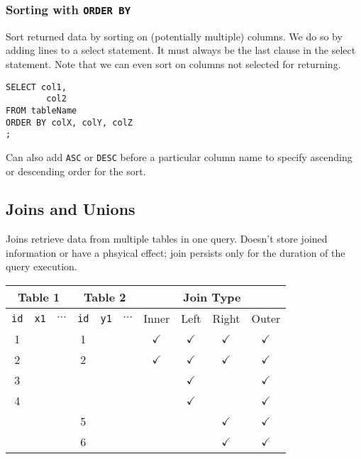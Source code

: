 \documentclass[12pt]{article}
\theoremstyle{plain}
\theoremstyle{definition}
\theoremstyle{remark}
\begin{document}
\subsubsection{Sorting with \texttt{ORDER BY}}

Sort returned data by sorting on (potentially multiple) columns.
We do so by adding lines to a select statement.
It must always be the last clause in the select statement.
Note that we can even sort on columns not selected for returning.
\begin{lstlisting}
SELECT col1,
        col2
FROM tableName
ORDER BY colX, colY, colZ
;
\end{lstlisting}
Can also add \texttt{ASC} or \texttt{DESC} before a particular
column name to specify ascending or descending order for the sort.




\clearpage
\subsection{Joins and Unions}


Joins retrieve data from multiple tables in one query.
Doesn't store joined information or have a phsyical effect;
join persists only for the duration of the query execution.

\begin{table}[htbp!]
\scriptsize
\centering
\begin{tabular}{|ccc|ccc|c|c|c|c|}
  \hline
  \multicolumn{3}{|c|}{Table 1}
  &
  \multicolumn{3}{|c|}{Table 2}
  &
  \multicolumn{4}{|c|}{Join Type}
  \\
  \hline
  \texttt{id} & \texttt{x1} & $\cdots$ &
  \texttt{id} & \texttt{y1} & $\cdots$
  & Inner
  & Left
  & Right
  & Outer
  \\
  \hline
  1 & & &
  1 & & &
  $\checkmark$ & $\checkmark$
  & $\checkmark$
  & $\checkmark$
  \\
  2 & & &
  2 & & &
  $\checkmark$ & $\checkmark$
  & $\checkmark$
  & $\checkmark$
  \\
  3 & & &
    & & &
    & $\checkmark$ &
  & $\checkmark$
  \\
  4 & & &
    & & &
    & $\checkmark$ &
  & $\checkmark$
  \\
    & & &
  5 & & &
    & &
    $\checkmark$
  & $\checkmark$
  \\
    & & &
  6 & & &
    & &
    $\checkmark$
  & $\checkmark$
  \\
  \hline
\end{tabular}
\end{table}
\end{document}
